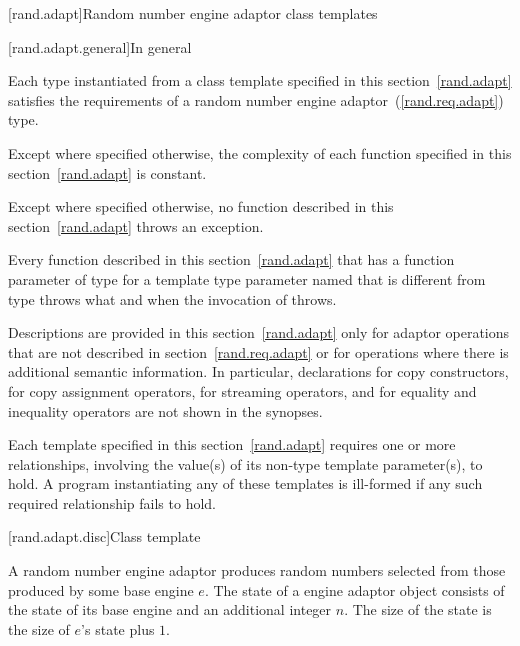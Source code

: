 

[rand.adapt]{Random number engine adaptor class templates}

[rand.adapt.general]{In general}

\pnum
Each type instantiated
from a class template specified in this section~\ref{rand.adapt}
satisfies the requirements
of a random number engine adaptor~(\ref{rand.req.adapt}) type.

\pnum
Except where specified otherwise,
the complexity of each function
specified in this section~\ref{rand.adapt}
is constant.

\pnum
Except where specified otherwise,
no function described in this section~\ref{rand.adapt}
throws an exception.

\pnum
Every function described in this section~\ref{rand.adapt}
that has a function parameter  of type 
for a template type parameter named 
that is different from type 
throws what and when the invocation of  throws.

\pnum
Descriptions are provided in this section~\ref{rand.adapt}
only for adaptor operations
that are not described in section~\ref{rand.req.adapt}
or for operations where there is additional semantic information.
In particular,
declarations for copy constructors,
for copy assignment operators,
for streaming operators,
and for equality and inequality operators
are not shown in the synopses.

\pnum
Each template specified in this section~\ref{rand.adapt}
requires one or more relationships,
involving the value(s) of its non-type template parameter(s), to hold.
A program instantiating any of these templates
is ill-formed
if any such required relationship fails to hold.


[rand.adapt.disc]{Class template }%
%

\pnum
A  random number engine adaptor
produces random numbers
selected from those produced by some base engine $e$.
The state%
%
of a  engine adaptor object 
consists of the state  of its base engine 
and an additional integer $n$.
The size of the state is
 the size of $e$'s state plus $1$.

